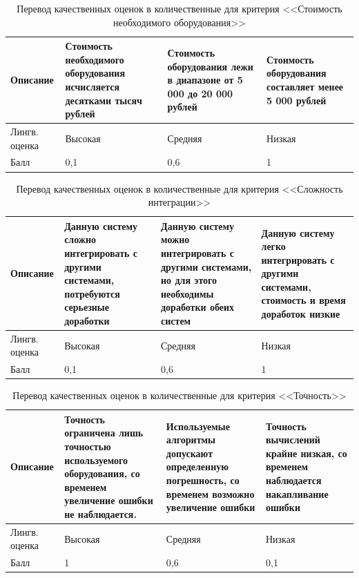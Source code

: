 \begin{table}[!htb]
	\caption{Перевод качественных оценок в количественные для критерия 
  <<Стоимость необходимого оборудования>>}
    \centering
	\begin{tabular}{|p{3cm}|p{}|p{}|p{}|}
	\hline 
	Описание & 
	Стоимость необходимого оборудования исчисляется десятками тысяч рублей & 
	Стоимость оборудования лежи в диапазоне от 5 000 до 20 000 рублей &
	Стоимость оборудования составляет менее 5 000 рублей \\ 
	\hline 
	Лингв. оценка & Высокая & Средняя & Низкая \\ 
	\hline 
	Балл & 0,1 & 0,6 & 1 \\ 
	\hline 
	\end{tabular} 
\end{table} 

\begin{table}[!htb]
	\caption{Перевод качественных оценок в количественные для критерия 
  <<Сложность интеграции>>}
    \centering
	\begin{tabular}{|p{3cm}|p{}|p{}|p{}|}
	\hline 
	Описание & 
	Данную систему сложно интегрировать с другими системами, потребуются серьезные доработки & 
	Данную систему можно интегрировать с другими системами, но для этого необходимы доработки обеих систем &
	Данную систему легко интегрировать с другими системами, стоимость и время доработок низкие \\ 
	\hline 
	Лингв. оценка & Высокая & Средняя & Низкая \\ 
	\hline 
	Балл & 0,1 & 0,6 & 1 \\ 
	\hline 
	\end{tabular} 
\end{table} 

\begin{table}[!htb]
	\caption{Перевод качественных оценок в количественные для критерия 
  <<Точность>>}
    \centering
	\begin{tabular}{|p{3cm}|p{}|p{}|p{}|}
	\hline 
	Описание & 
	Точность ограничена лишь точностью используемого оборудования, со временем увеличение ошибки не наблюдается. & 
	Используемые алгоритмы допускают определенную погрешность, со временем возможно увеличение ошибки &
	Точность вычислений крайне низкая, со временем наблюдается накапливание ошибки \\ 
	\hline 
	Лингв. оценка & Высокая & Средняя & Низкая \\ 
	\hline 
	Балл & 1 & 0,6 & 0,1 \\ 
	\hline 
	\end{tabular} 
\end{table} 

